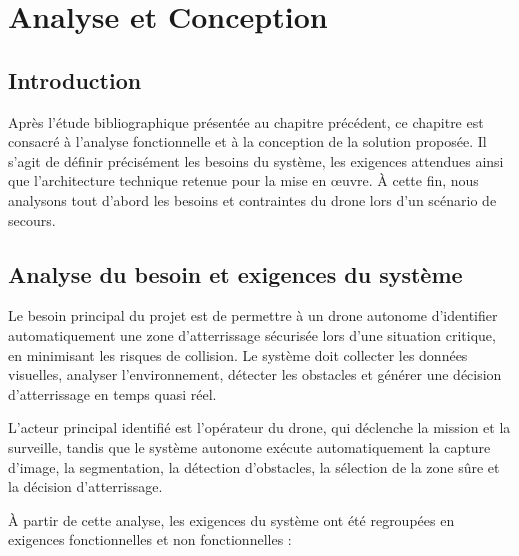 \chapter{Analyse et Conception}
\label{chap:conception}

\section{Introduction}

Après l'étude bibliographique présentée au chapitre précédent, ce chapitre est consacré à l'analyse fonctionnelle et à la conception de la solution proposée. Il s'agit de définir précisément les besoins du système, les exigences attendues ainsi que l'architecture technique retenue pour la mise en œuvre. À cette fin, nous analysons tout d'abord les besoins et contraintes du drone lors d'un scénario de secours.

\section{Analyse du besoin et exigences du système}
\label{sec:analyse-besoin}

Le besoin principal du projet est de permettre à un drone autonome d'identifier automatiquement une zone d'atterrissage sécurisée lors d'une situation critique, en minimisant les risques de collision. Le système doit collecter les données visuelles, analyser l'environnement, détecter les obstacles et générer une décision d'atterrissage en temps quasi réel.

L'acteur principal identifié est l'opérateur du drone, qui déclenche la mission et la surveille, tandis que le système autonome exécute automatiquement la capture d'image, la segmentation, la détection d'obstacles, la sélection de la zone sûre et la décision d'atterrissage.

À partir de cette analyse, les exigences du système ont été regroupées en exigences fonctionnelles et non fonctionnelles :

